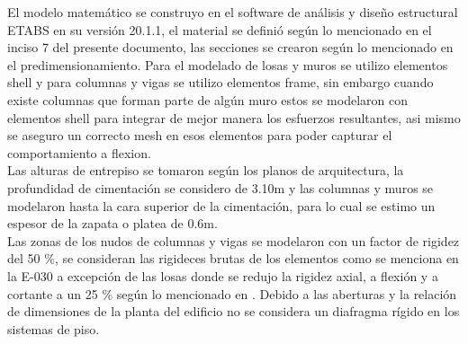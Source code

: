 \documentclass[12pt]{article}
\begin{document}
El modelo matemático se construyo en el software de análisis y diseño estructural ETABS en su versión 20.1.1, el material se definió según lo mencionado en el inciso 7 del presente documento, las secciones se crearon según lo mencionado en el predimensionamiento. Para el modelado de losas y muros se utilizo elementos shell y para columnas y vigas se utilizo elementos frame, sin embargo cuando existe columnas que forman parte de algún muro estos se modelaron con elementos shell para integrar de mejor manera los esfuerzos resultantes, asi mismo se aseguro un correcto mesh en esos elementos para poder capturar el comportamiento a flexion. 
\\
Las alturas de entrepiso se tomaron según los planos de arquitectura, la profundidad de cimentación se considero de 3.10m y las columnas y muros se modelaron hasta la cara superior de la cimentación, para lo cual se estimo un espesor de la zapata o platea de 0.6m. 
\\
Las zonas de los nudos de columnas y vigas se modelaron con un factor de rigidez del 50 \%, se consideran las rigideces brutas de los elementos como se menciona en la E-030 a excepción de las losas donde se redujo la rigidez axial, a flexión y a cortante a un 25 \% según lo mencionado en \cite{ACI19}. Debido a las aberturas y la relación de dimensiones de la planta del edificio no se considera un diafragma rígido en los sistemas de piso.
\\
\newpage
\end{document}
